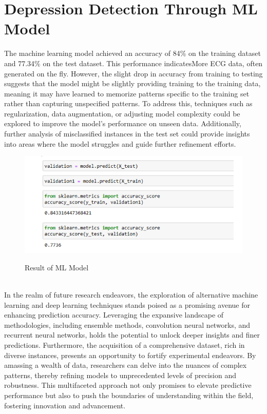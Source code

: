 \section{Depression Detection Through ML Model}
The machine learning model achieved an accuracy of 84\% on the training dataset and 77.34\% on the test dataset. This performance indicatesMore ECG data, often generated on the fly. However, the slight drop in accuracy from training to testing suggests that the model might be slightly providing training to the training data, meaning it may have learned to memorize patterns specific to the training set rather than capturing unspecified patterns. To address this, techniques such as regularization, data augmentation, or adjusting model complexity could be explored to improve the model's performance on unseen data. Additionally, further analysis of misclassified instances in the test set could provide insights into areas where the model struggles and guide further refinement efforts.\cite{chiong2021textual}
\\
 \begin{figure}[htbp]
    \centering
     \includegraphics[width=0.9\linewidth]{C_chap/fig22.png}
\\\caption{Result of ML Model}
 \end{figure}
\\
In the realm of future research endeavors, the exploration of alternative machine learning and deep learning techniques stands poised as a promising avenue for enhancing prediction accuracy. Leveraging the expansive landscape of methodologies, including ensemble methods, convolution neural networks, and recurrent neural networks, holds the potential to unlock deeper insights and finer predictions. Furthermore, the acquisition of a comprehensive dataset, rich in diverse instances, presents an opportunity to fortify experimental endeavors. By amassing a wealth of data, researchers can delve into the nuances of complex patterns, thereby refining models to unprecedented levels of precision and robustness. This multifaceted approach not only promises to elevate predictive performance but also to push the boundaries of understanding within the field, fostering innovation and advancement.

